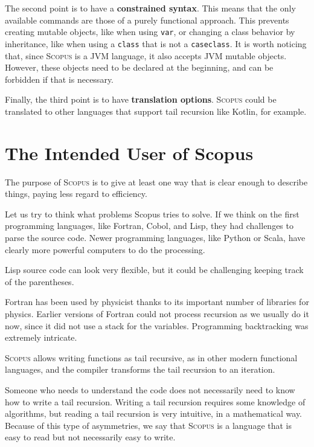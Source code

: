 \documentclass[12pt,a4paper]{book}
\newcommand{\srccode}[1]{\texttt{{#1}}}
\newcommand{\reservedWord}[1]{{\color{blue}\srccode{#1}}\xspace}
\newcommand{\scalacase}{\reservedWord{case}}
\newcommand{\scalaclass}{\reservedWord{class}}
\newcommand{\scalavar}{\reservedWord{var}}
\newcommand{\Scopus}{\textsc{Scopus}\xspace}
\begin{document}
    The second point is to have a \textbf{constrained syntax}.
    This means that the only available commands are those of a purely functional approach.
    This prevents creating mutable objects, like when using \scalavar, or changing a class behavior by inheritance, like when using a \scalaclass that is not a \scalacase \scalaclass.
    It is worth noticing that, since \Scopus is a JVM language, it also accepts JVM mutable objects.
    However, these objects need to be declared at the beginning, and can be forbidden if that is necessary.

    Finally, the third point is to have \textbf{translation options}.
    \Scopus could be translated to other languages that support tail recursion like Kotlin, for example.


    \section{The Intended User of Scopus}

    The purpose of \Scopus is to give at least one way that is clear enough to describe things, paying less regard to efficiency.

    Let us try to think what problems Scopus tries to solve.
    If we think on the first programming languages, like Fortran, Cobol, and Lisp, they had challenges to parse the source code.
    Newer programming languages, like Python or Scala, have clearly more powerful computers to do the processing.

    Lisp source code can look very flexible, but it could be challenging keeping track of the parentheses.

    Fortran has been used by physicist thanks to its important number of libraries for physics.
    Earlier versions of Fortran could not process recursion as we usually do it now, since it did not use a stack for the variables.
    Programming backtracking was extremely intricate.

    \Scopus allows writing functions as tail recursive, as in other modern functional languages, and the compiler transforms the tail recursion to an iteration.

    Someone who needs to understand the code does not necessarily need to know how to write a tail recursion.
    Writing a tail recursion requires some knowledge of algorithms, but reading a tail recursion is very intuitive, in a mathematical way.
    Because of this type of asymmetries, we say that \Scopus is a language that is easy to read but not necessarily easy to write.
\end{document}
